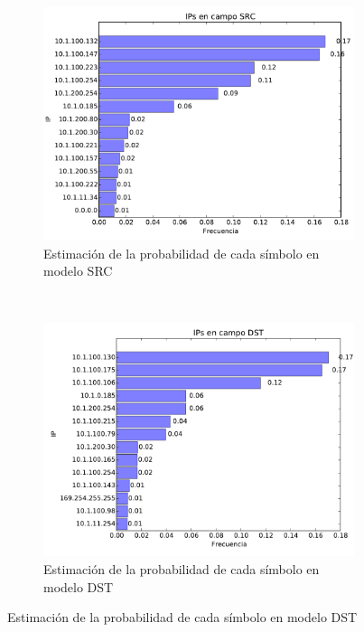 \begin{figure}[H]
	\center
	\begin{subfigure}{0.4\textwidth}
		\includegraphics[width=1.0\textwidth]{resultados/entrepiso/ipsSrc_4_25991830161.pdf}
		\caption{Estimaci\'on de la probabilidad de cada s\'imbolo en modelo SRC}
	\end{subfigure}
	~
	\begin{subfigure}{0.4\textwidth}
		\includegraphics[width=1.0\textwidth]{resultados/entrepiso/ipsDst_4_90633854055.pdf}
		\caption{Estimaci\'on de la probabilidad de cada s\'imbolo en modelo DST}
	\end{subfigure}
\end{figure}

